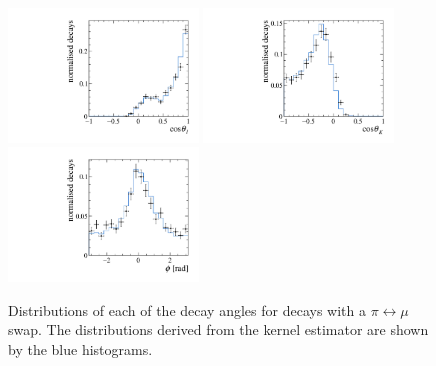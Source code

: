 \begin{figure}[!tb]
\centering
\includegraphics[width=0.45\textwidth]{figs/kpimm/selection/jpsi_pimu_costhetal.pdf}
\includegraphics[width=0.45\textwidth]{figs/kpimm/selection/jpsi_pimu_costhetak.pdf}
\includegraphics[width=0.45\textwidth]{figs/kpimm/selection/jpsi_pimu_phi.pdf}
\caption{Distributions of each of the decay angles for \BdToJPsiKpi decays with a $\pi\leftrightarrow\mu$ swap. The distributions derived from the kernel estimator are shown by the blue histograms.}
\label{fig:appendix::kernel:angles}
\end{figure}